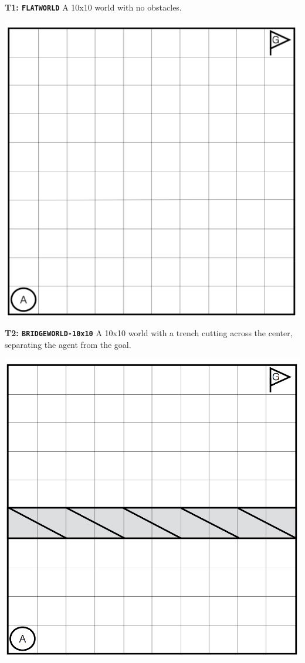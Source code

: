 \documentclass[]{article}
\begin{document}
{\bf T1: \texttt{FLATWORLD}} A 10x10 world with no obstacles.

\begin{center}
\includegraphics[scale=0.24]{figures/flatland.png}

\end{center}



{\bf T2: \texttt{BRIDGEWORLD-10x10}} A 10x10 world with a trench cutting across the center, separating the agent from the goal.

\begin{center}
\includegraphics[scale=0.28]{figures/bridgeworld10.png}
\end{center}
\end{document}
